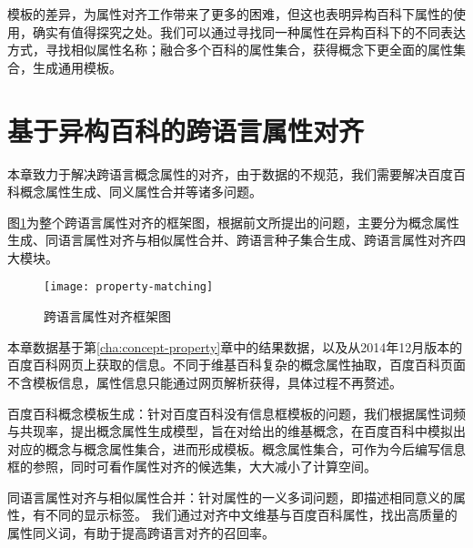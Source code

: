 模板的差异，为属性对齐工作带来了更多的困难，但这也表明异构百科下属性的使用，确实有值得探究之处。我们可以通过寻找同一种属性在异构百科下的不同表达方式，寻找相似属性名称；融合多个百科的属性集合，获得概念下更全面的属性集合，生成通用模板。

\section{基于异构百科的跨语言属性对齐}
\label{sec:property-matching}

本章致力于解决跨语言概念属性的对齐，由于数据的不规范，我们需要解决百度百科概念属性生成、同义属性合并等诸多问题。


图\ref{fig:property-matching}为整个跨语言属性对齐的框架图，根据前文所提出的问题，主要分为概念属性生成、同语言属性对齐与相似属性合并、跨语言种子集合生成、跨语言属性对齐四大模块。

\begin{figure}[h]
  \centering
  \texttt{[image: property-matching]}
  \caption{跨语言属性对齐框架图}
  \label{fig:property-matching}
\end{figure}

本章数据基于第\ref{cha:concept-property}章中的结果数据，以及从2014年12月版本的百度百科网页上获取的信息。不同于维基百科复杂的概念属性抽取，百度百科页面不含模板信息，属性信息只能通过网页解析获得，具体过程不再赘述。

{\heiti 百度百科概念模板生成：}针对百度百科没有信息框模板的问题，我们根据属性词频与共现率，提出概念属性生成模型，旨在对给出的维基概念，在百度百科中模拟出对应的概念与概念属性集合，进而形成模板。概念属性集合，可作为今后编写信息框的参照，同时可看作属性对齐的候选集，大大减小了计算空间。

{\heiti 同语言属性对齐与相似属性合并：}针对属性的一义多词问题，即描述相同意义的属性，有不同的显示标签。
我们通过对齐中文维基与百度百科属性，找出高质量的属性同义词，有助于提高跨语言对齐的召回率。

